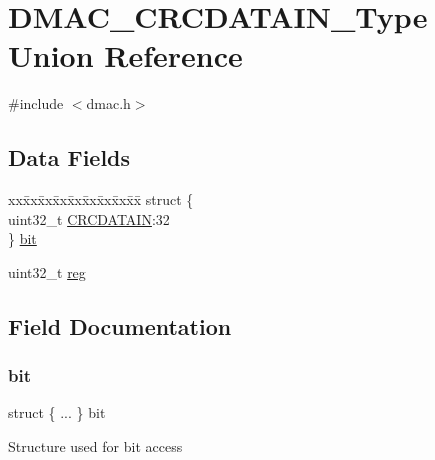 \hypertarget{union_d_m_a_c___c_r_c_d_a_t_a_i_n___type}{}\section{D\+M\+A\+C\+\_\+\+C\+R\+C\+D\+A\+T\+A\+I\+N\+\_\+\+Type Union Reference}
\label{union_d_m_a_c___c_r_c_d_a_t_a_i_n___type}


{\ttfamily \#include $<$dmac.\+h$>$}

\subsection*{Data Fields}
\begin{DoxyCompactItemize}
\item 
\begin{tabbing}
xx\=xx\=xx\=xx\=xx\=xx\=xx\=xx\=xx\=\kill
struct \{\\
\>uint32\_t \mbox{\hyperlink{union_d_m_a_c___c_r_c_d_a_t_a_i_n___type_aff0199c8c8f2af00ce13bf9617a2ad7a}{CRCDATAIN}}:32\\
\} \mbox{\hyperlink{union_d_m_a_c___c_r_c_d_a_t_a_i_n___type_ae3d50c4dc4a79f15159628c51ce2b0b2}{bit}}\\

\end{tabbing}\item 
uint32\+\_\+t \mbox{\hyperlink{union_d_m_a_c___c_r_c_d_a_t_a_i_n___type_a6b91636401516a477989a336376d7b40}{reg}}
\end{DoxyCompactItemize}


\subsection{Field Documentation}
\mbox{\label{union_d_m_a_c___c_r_c_d_a_t_a_i_n___type_ae3d50c4dc4a79f15159628c51ce2b0b2}} 
\subsubsection{\texorpdfstring{bit}{bit}}
{\footnotesize\ttfamily struct \{ ... \}   bit}

Structure used for bit access \mbox{\label{union_d_m_a_c___c_r_c_d_a_t_a_i_n___type_aff0199c8c8f2af00ce13bf9617a2ad7a}} 
